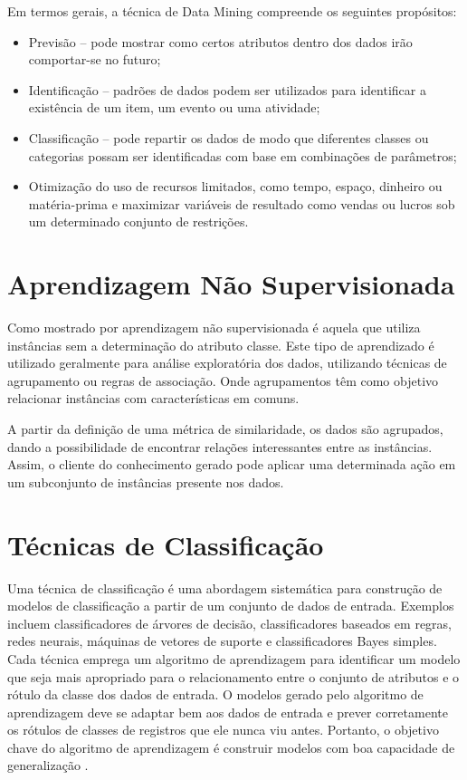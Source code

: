 \documentclass[
	12pt,				%
	openright,			%
	oneside,	
	a4paper,				%
	english,				%
	brazil				%
]{abntex2/abntex2} %
\begin{document}
		Em termos gerais, a técnica de Data Mining compreende os seguintes propósitos:
		
		\begin{itemize}
			\item Previsão – pode mostrar como certos atributos dentro dos dados irão comportar-se no futuro;
			\item Identificação – padrões de dados podem ser utilizados para identificar a existência de um item, um evento ou uma atividade;
			\item Classificação – pode repartir os dados de modo que diferentes classes ou categorias possam ser identificadas com base em combinações de parâmetros;
			\item Otimização do uso de recursos limitados, como tempo, espaço, dinheiro ou matéria-prima e maximizar variáveis de resultado como vendas ou lucros sob um determinado conjunto de restrições.
		\end{itemize}
		
	\section{Aprendizagem Não Supervisionada}
	
		Como mostrado por \cite{damasceno:2005} aprendizagem não supervisionada é aquela que utiliza instâncias sem a determinação do atributo classe. Este  tipo de aprendizado é utilizado geralmente para análise exploratória dos dados, utilizando técnicas de  agrupamento ou regras de associação. Onde agrupamentos têm como objetivo relacionar instâncias com características em comuns.
		
		A partir da definição de uma métrica de similaridade, os dados são  agrupados, dando a possibilidade de encontrar relações interessantes entre as instâncias. Assim, o cliente do conhecimento gerado pode aplicar uma determinada ação em um subconjunto de instâncias presente nos  dados. 
		
	\section{Técnicas de Classificação}
	
	Uma técnica de classificação é uma abordagem sistemática para construção de modelos de classificação a partir de um conjunto de dados de entrada. Exemplos incluem classificadores de árvores de decisão, classificadores baseados em regras, redes neurais, máquinas de vetores de suporte e classificadores Bayes simples. Cada técnica emprega um algoritmo de aprendizagem para identificar um modelo que seja mais apropriado para o relacionamento entre o conjunto de atributos e o rótulo da classe dos dados de entrada. O modelos gerado pelo algoritmo de aprendizagem deve se adaptar bem aos dados de entrada e prever corretamente os rótulos de classes de registros que ele nunca viu antes. Portanto, o objetivo chave do algoritmo de aprendizagem é construir modelos com boa capacidade de generalização \cite{tan:2009}.
	
\end{document}
